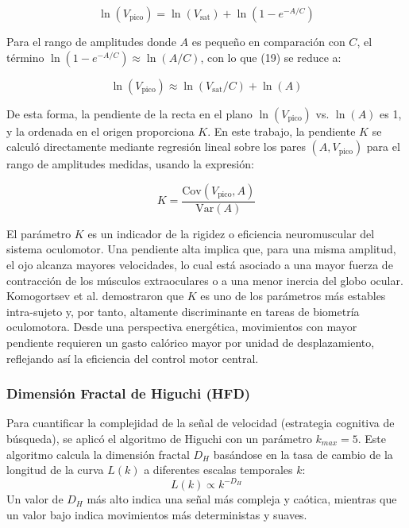\begin{equation}
	\ln(V_{\text{pico}}) = \ln(V_{\text{sat}}) + \ln\!\left(1 - e^{-A/C}\right) \tag{19}
\end{equation}

Para el rango de amplitudes donde $A$ es pequeño en comparación con $C$, el término $\ln(1 - e^{-A/C}) \approx \ln(A/C)$, con lo que (19) se reduce a:

\begin{equation}
	\ln(V_{\text{pico}}) \approx \ln(V_{\text{sat}}/C) + \ln(A) \tag{20}
\end{equation}

De esta forma, la pendiente de la recta en el plano $\ln(V_{\text{pico}})$ vs. $\ln(A)$ es 1, y la ordenada en el origen proporciona $K$. En este trabajo, la pendiente $K$ se calculó directamente mediante regresión lineal sobre los pares $(A, V_{\text{pico}})$ para el rango de amplitudes medidas, usando la expresión:

\begin{equation}
	K = \frac{\text{Cov}(V_{\text{pico}}, A)}{\text{Var}(A)} \tag{21}
\end{equation}

El parámetro $K$ es un indicador de la rigidez o eficiencia neuromuscular del sistema oculomotor. Una pendiente alta implica que, para una misma amplitud, el ojo alcanza mayores velocidades, lo cual está asociado a una mayor fuerza de contracción de los músculos extraoculares o a una menor inercia del globo ocular. Komogortsev et al. \cite{komogortsev2010} demostraron que $K$ es uno de los parámetros más estables intra-sujeto y, por tanto, altamente discriminante en tareas de biometría oculomotora. Desde una perspectiva energética, movimientos con mayor pendiente requieren un gasto calórico mayor por unidad de desplazamiento, reflejando así la eficiencia del control motor central.

\subsubsection{Dimensión Fractal de Higuchi (HFD)}
Para cuantificar la complejidad de la señal de velocidad (estrategia cognitiva de búsqueda), se aplicó el algoritmo de Higuchi \cite{higuchi1988} con un parámetro $k_{max}=5$.
Este algoritmo calcula la dimensión fractal $D_H$ basándose en la tasa de cambio de la longitud de la curva $L(k)$ a diferentes escalas temporales $k$:
\begin{equation}
	L(k) \propto k^{-D_H}
\end{equation}
Un valor de $D_H$ más alto indica una señal más compleja y caótica, mientras que un valor bajo indica movimientos más deterministas y suaves.

